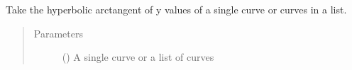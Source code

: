 \documentclass[letterpaper,10pt,english]{sphinxmanual}
\begin{document}

\begin{fulllineitems}
\label{\detokenize{pydv:pydvpy.atanh}}
Take the hyperbolic arctangent of y values of a single curve or curves in a list.

\begin{sphinxVerbatim}[commandchars=\\\{\}]
  
\end{sphinxVerbatim}

\begin{sphinxVerbatim}[commandchars=\\\{\}]
\end{sphinxVerbatim}
\begin{quote}\begin{description}
\item[{Parameters}] \leavevmode
{} () \textendash{} A single curve or a list of curves

\end{description}\end{quote}

\end{fulllineitems}

\end{document}
